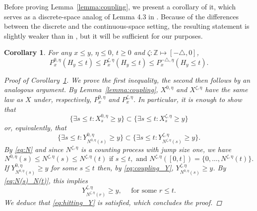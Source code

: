 \documentclass[12pt,reqno,oneside]{amsart}
\numberwithin{equation}{section}
\newtheorem{corollary}[theorem]{Corollary}
\theoremstyle{definition}
\theoremstyle{remark}
\newcommand{\Z}{\mathbb{Z}}
\begin{document}
    Before proving Lemma~\ref{lemma:coupling}, we present a corollary of it, which serves as a discrete-space analog of Lemma 4.3 in \cite{CDO25}.
    Because of the differences between the discrete and the continuous-space setting, the resulting statement is slightly weaker than in \cite{CDO25}, but it will be sufficient for our purposes.
\begin{corollary}
  \label{cor:coupling}
  For any $x \leq y$, $\eta \leq 0$, $t \geq 0$ and
  $\zeta: \Z \mapsto [-\triangle,0]$,
  \begin{equation}
    \label{eq:coupling}
    P_x^{0,\eta}(H_y \leq t) \leq P_x^{\zeta, \eta}(H_y \leq t)
    \leq P_x^{-\triangle, \eta}(H_y \leq t).
  \end{equation}

  \begin{proof}[Proof of Corollary~\ref{cor:coupling}]
    We prove the first inequality, the second then follows by an analogous
    argument. By Lemma~\ref{lemma:coupling}, $X^{0,\eta}$ and
    $X^{\zeta,\eta}$ have the same law as $X$ under, respectively,
    $P_x^{0, \eta}$ and $P_x^{\zeta, \eta}$. In particular, it is enough to
    show that
    \begin{equation*}
      \big\{ \exists s \leq t: X^{0, \eta}_s \geq y \big\}
      \subset \big\{ \exists s \leq t: X^{\zeta, \eta}_s \geq y \big\}
    \end{equation*}
    or, equivalently, that
    \begin{equation}
      \label{eq:hitting_Y}
      \big\{ \exists s \leq t: Y^{0, \eta}_{N^{0, \eta}(s) } \geq y \big\}
      \subset \big\{ \exists s \leq t: Y^{\zeta, \eta}_{N^{\zeta, \eta}(s) } \geq y \big\}.
    \end{equation}
    By \eqref{eq:N} and since $N^{\zeta, \eta}$ is a counting process with
    jump size one, we have
    \begin{equation}\label{eq:N(s)_N(t)}
      N^{0, \eta}(s) \leq N^{\zeta, \eta}(s) \leq N^{\zeta, \eta}(t) \text{ if } s \leq t, \text{ and } N^{\zeta, \eta}([0,t]) = \{0,\dots,N^{\zeta, \eta}(t)\}.
    \end{equation}
    If $Y^{0, \eta}_{N^{0, \eta}(s) } \geq y$ for some $s \leq t$ then, by \eqref{eq:coupling_Y}, $Y^{\zeta, \eta}_{N^{0, \eta}(s) } \geq y$. By \eqref{eq:N(s)_N(t)}, this implies
    \begin{equation*}
        Y^{\zeta, \eta}_{N^{\zeta, \eta}(r) } \geq y, \quad \text{ for some } r \leq t.
    \end{equation*}
    We deduce that \eqref{eq:hitting_Y} is satisfied, which concludes the proof.
  \end{proof}

\end{corollary}
\end{document}
